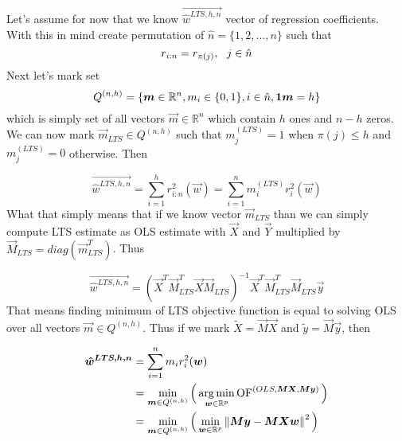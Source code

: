 Let's assume for now that we know $\vec{\hat{w}^{LTS, h, n}}$ vector of regression coefficients. With this in mind create permutation of $\hat{n} = \{{1,2,\ldots, n\}}$ such that 
\begin{equation}
    r_{i:n} = r_{\pi(j)}\\, \ \ j \in \hat{n}
\end{equation}
Next let's mark set
 \begin{equation}
   Q^{(n,h)} = \{{\vec{m} \in \mathbb{R}^n \\, m_i \in \{{0, 1\}} \\,i \in \hat{n} \\, \vec{1}\vec{m} = h \}}
\end{equation}
which is simply set of all vectors $\vec{m} \in \mathbb{R}^n$ which contain $h$ ones and $n-h$ zeros. We can now mark $\vec{m}_{LTS} \in Q^{(n,h)}$  such that  $m^{(LTS)}_j = 1$ when $\pi(j) \leq h$ and $m^{(LTS)}_j = 0$ otherwise. Then

\begin{equation} \label{ltshat}
    \vec{\hat{w}^{LTS, h, n}} =  \sum\limits_{i=1}^h r_{i:n}^2(\vec{w}) =  \sum\limits_{i=1}^n 
    m^{(LTS)}_i r_{i}^2(\vec{w})
\end{equation}
What that simply means that if we know vector $\vec{m}_{LTS}$ than we can simply compute LTS estimate as OLS estimate with $\vec{X}$ and $\vec{Y}$ multiplied by $\vec{M}_{LTS} = diag(\vec{m}^T_{LTS})$. Thus 

\begin{equation} 
    \vec{\hat{w}^{LTS, h, n}} = (\vec{X}^T\vec{M}^T_{LTS}\vec{X}\vec{M}_{LTS})^{-1}\vec{X}^T\vec{M}^T_{LTS}\vec{M}_{LTS}\vec{y}
\end{equation}
That means finding minimum of LTS objective function is equal to solving OLS over all vectors 
$\vec{m} \in Q^{(n,h)}$. Thus if we mark $\tilde{X} = \vec{M}\vec{X} $ and $\tilde{y} = \vec{M}\vec{y} $, then

\begin{align*} 
    \vec{\hat{w}^{LTS, h, n}}
     &=  \sum\limits_{i=1}^n 
     m_i r_{i}^2(\vec{w})\\
    &= \minim_{\vec{m} \in Q^{(n,h)}} 
    \Big( \argmin_{\vec{w} \in\mathbb{R}^p} 
    \of^{(OLS,\vec{M}\vec{X},  \vec{M}\vec{y} )} \Big)\\
    &= \minim_{\vec{m} \in Q^{(n,h)}} 
    \Big(\minim_{\vec{w} \in\mathbb{R}^p}  \norm{ \vec{M}\vec{y} -   \vec{M}\vec{X}\vec{w}  }^2 \Big)
\end{align*}

